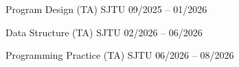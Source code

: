
\VectraTeachingCourseInstitutionEntry
    {Program Design (TA)}
    {SJTU}
    {09/2025 -- 01/2026}

\VectraTeachingCourseInstitutionEntry
    {Data Structure (TA)}
    {SJTU}
    {02/2026 -- 06/2026}

\VectraTeachingCourseInstitutionEntry
    {Programming Practice (TA)}
    {SJTU}
    {06/2026 -- 08/2026}
